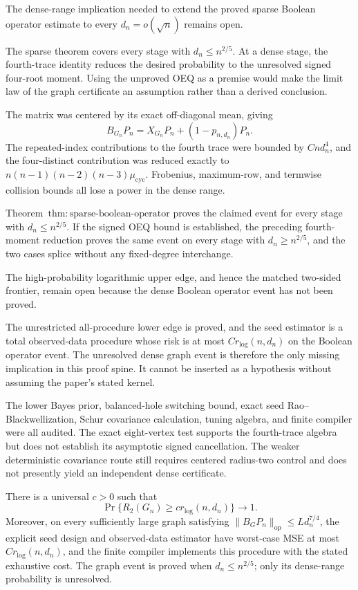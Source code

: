The dense-range implication needed to extend the proved sparse Boolean
operator estimate to every \(d_n=o(\sqrt n)\) remains open.

The sparse theorem covers every stage with \(d_n\le n^{2/5}\).  At a dense
stage, the fourth-trace identity reduces the desired probability to the
unresolved signed four-root moment.  Using the unproved OEQ as a premise
would make the limit law of the graph certificate an assumption rather
than a derived conclusion.

The matrix was centered by its exact off-diagonal mean, giving
\[
B_{G_n}P_n=X_{G_n}P_n+(1-p_{n,d_n})P_n.
\]
The repeated-index contributions to the fourth trace were bounded by
\(Cnd_n^4\), and the four-distinct contribution was reduced exactly to
\(n(n-1)(n-2)(n-3)\mu_{\mathrm{cyc}}\).  Frobenius, maximum-row, and
termwise collision bounds all lose a power in the dense range.

Theorem~\(\mathrm{thm{:}sparse\mbox{-}boolean\mbox{-}operator}\) proves the
claimed event for every stage with \(d_n\le n^{2/5}\).  If the signed OEQ
bound is established, the preceding fourth-moment reduction proves the
same event on every stage with \(d_n\ge n^{2/5}\), and the two cases splice
without any fixed-degree interchange.

The high-probability logarithmic upper edge, and hence the matched
two-sided frontier, remain open because the dense Boolean operator event
has not been proved.

The unrestricted all-procedure lower edge is proved, and the seed estimator
is a total observed-data procedure whose risk is at most
\(C r_{\log}(n,d_n)\) on the Boolean operator event.  The unresolved dense
graph event is therefore the only missing implication in this proof spine.
It cannot be inserted as a hypothesis without assuming the paper's stated
kernel.

The lower Bayes prior, balanced-hole switching bound, exact seed
Rao--Blackwellization, Schur covariance calculation, tuning algebra, and
finite compiler were all audited.  The exact eight-vertex test supports
the fourth-trace algebra but does not establish its asymptotic signed
cancellation.  The weaker deterministic covariance route still requires
centered radius-two control and does not presently yield an independent
dense certificate.

There is a universal \(c>0\) such that
\[
\Pr\{R_2(G_n)\ge c r_{\log}(n,d_n)\}\to1.
\]
Moreover, on every sufficiently large graph satisfying
\(\|B_GP_n\|_{\mathrm{op}}\le Ld_n^{7/4}\), the explicit seed design and
observed-data estimator have worst-case MSE at most
\(C r_{\log}(n,d_n)\), and the finite compiler implements this procedure
with the stated exhaustive cost.  The graph event is proved when
\(d_n\le n^{2/5}\); only its dense-range probability is unresolved.

